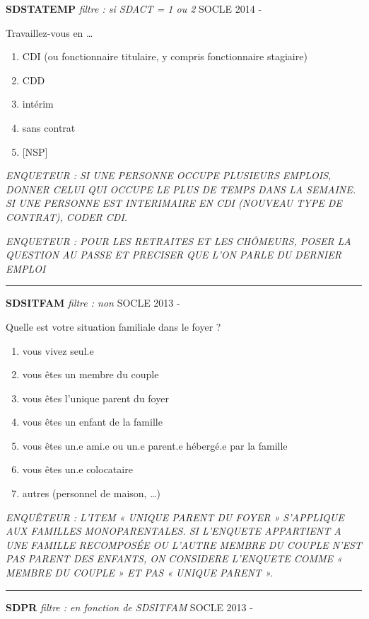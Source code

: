 \documentclass[12pt,a4paper]{reedthesis}
\providecommand{\tightlist}{%
  \setlength{\itemsep}{0pt}\setlength{\parskip}{0pt}}
\begin{document}
\textbf{SDSTATEMP} \emph{filtre : si SDACT = 1 ou 2} SOCLE 2014 -

Travaillez-vous en \ldots{}
\begin{enumerate}
\def\labelenumi{\arabic{enumi}.}
\tightlist
\item
  CDI (ou fonctionnaire titulaire, y compris fonctionnaire stagiaire)
\item
  CDD
\item
  intérim
\item
  sans contrat
\item
  {[}NSP{]}
\end{enumerate}
\emph{ENQUETEUR : SI UNE PERSONNE OCCUPE PLUSIEURS EMPLOIS, DONNER CELUI QUI OCCUPE LE PLUS DE TEMPS DANS LA SEMAINE. SI UNE PERSONNE EST INTERIMAIRE EN CDI (NOUVEAU TYPE DE CONTRAT), CODER CDI.}

\emph{ENQUETEUR : POUR LES RETRAITES ET LES CHÔMEURS, POSER LA QUESTION AU PASSE ET PRECISER QUE L'ON PARLE DU DERNIER EMPLOI}
\begin{center}\rule{0.5\linewidth}{0.5pt}\end{center}

\textbf{SDSITFAM} \emph{filtre : non} SOCLE 2013 -

Quelle est votre situation familiale dans le foyer ?
\begin{enumerate}
\def\labelenumi{\arabic{enumi}.}
\tightlist
\item
  vous vivez seul.e
\item
  vous êtes un membre du couple
\item
  vous êtes l'unique parent du foyer
\item
  vous êtes un enfant de la famille
\item
  vous êtes un.e ami.e ou un.e parent.e hébergé.e par la famille
\item
  vous êtes un.e colocataire
\item
  autres (personnel de maison, \ldots)
\end{enumerate}
\emph{ENQUÊTEUR : L'ITEM « UNIQUE PARENT DU FOYER » S'APPLIQUE AUX FAMILLES MONOPARENTALES. SI L'ENQUETE APPARTIENT A UNE FAMILLE RECOMPOSÉE OU L'AUTRE MEMBRE DU COUPLE N'EST PAS PARENT DES ENFANTS, ON CONSIDERE L'ENQUETE COMME « MEMBRE DU COUPLE » ET PAS « UNIQUE PARENT ».}
\begin{center}\rule{0.5\linewidth}{0.5pt}\end{center}

\textbf{SDPR} \emph{filtre : en fonction de SDSITFAM} SOCLE 2013 -
\end{document}
